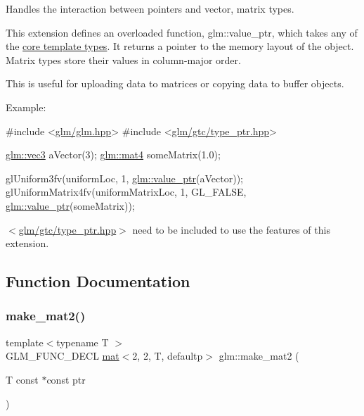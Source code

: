 Handles the interaction between pointers and vector, matrix types.

This extension defines an overloaded function, glm\+::value\+\_\+ptr, which takes any of the \hyperlink{group__core__template}{core template types}. It returns a pointer to the memory layout of the object. Matrix types store their values in column-\/major order.

This is useful for uploading data to matrices or copying data to buffer objects.

Example\+: 
\begin{DoxyCode}
\textcolor{preprocessor}{#include <\hyperlink{glm_8hpp}{glm/glm.hpp}>}
\textcolor{preprocessor}{#include <\hyperlink{type__ptr_8hpp}{glm/gtc/type\_ptr.hpp}>}

\hyperlink{structglm_1_1vec}{glm::vec3} aVector(3);
\hyperlink{structglm_1_1mat}{glm::mat4} someMatrix(1.0);

glUniform3fv(uniformLoc, 1, \hyperlink{group__gtc__type__ptr_ga1c64669e1ba1160ad9386e43dc57569a}{glm::value\_ptr}(aVector));
glUniformMatrix4fv(uniformMatrixLoc, 1, GL\_FALSE, \hyperlink{group__gtc__type__ptr_ga1c64669e1ba1160ad9386e43dc57569a}{glm::value\_ptr}(someMatrix));
\end{DoxyCode}


$<$\hyperlink{type__ptr_8hpp}{glm/gtc/type\+\_\+ptr.\+hpp}$>$ need to be included to use the features of this extension. 

\subsection{Function Documentation}
\mbox{\label{group__gtc__type__ptr_ga04409e74dc3da251d2501acf5b4b546c}} 
\subsubsection{\texorpdfstring{make\+\_\+mat2()}{make\_mat2()}}
{\footnotesize\ttfamily template$<$typename T $>$ \\
G\+L\+M\+\_\+\+F\+U\+N\+C\+\_\+\+D\+E\+CL \hyperlink{structglm_1_1mat}{mat}$<$2, 2, T, defaultp$>$ glm\+::make\+\_\+mat2 (\begin{DoxyParamCaption}\item[{T const $\ast$const}]{ptr }\end{DoxyParamCaption})}



